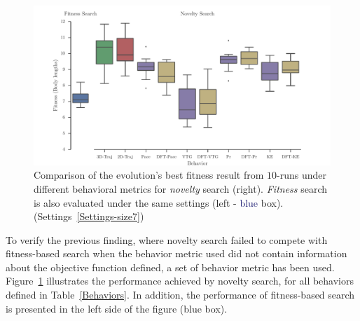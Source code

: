 \begin{figure}[t!]
\centering
\includegraphics[width=1.0\textwidth]{../Figures/Results/BehaviorsPerformance.pdf}
\caption{Comparison of the evolution's best fitness result from $10$-runs under different behavioral metrics for \emph{novelty} search (right). \emph{Fitness} search is also evaluated under the same settings (left - \textcolor{MidnightBlue}{blue} box). (Settings~\ref{Settings-size7})}
\label{fig:BehaviorsPerformance}
\end{figure}

To verify the previous finding, where novelty search failed to compete with fitness-based search when the behavior metric used did not contain information about the objective function defined, a set of behavior metric has been used. Figure~\ref{fig:BehaviorsPerformance} illustrates the performance achieved by novelty search, for all behaviors defined in Table~\ref{Behaviors}. In addition, the performance of fitness-based search is presented in the left side of the figure (\textcolor{NavyBlue}{blue} box).

